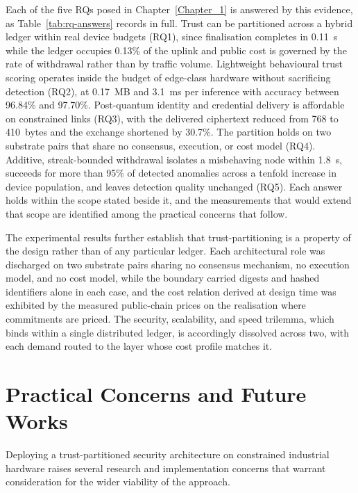 Each of the five RQs posed in Chapter~\ref{Chapter_1} is answered by this evidence, as Table~\ref{tab:rq-answers} records in full. Trust can be partitioned across a hybrid ledger within real device budgets (RQ1), since finalisation completes in 0.11~s while the ledger occupies 0.13\% of the uplink and public cost is governed by the rate of withdrawal rather than by traffic volume. Lightweight behavioural trust scoring operates inside the budget of edge-class hardware without sacrificing detection (RQ2), at 0.17~MB and 3.1~ms per inference with accuracy between 96.84\% and 97.70\%. Post-quantum identity and credential delivery is affordable on constrained links (RQ3), with the delivered ciphertext reduced from 768 to 410~bytes and the exchange shortened by 30.7\%. The partition holds on two substrate pairs that share no consensus, execution, or cost model (RQ4). Additive, streak-bounded withdrawal isolates a misbehaving node within 1.8~s, succeeds for more than 95\% of detected anomalies across a tenfold increase in device population, and leaves detection quality unchanged (RQ5). Each answer holds within the scope stated beside it, and the measurements that would extend that scope are identified among the practical concerns that follow.

The experimental results further establish that trust-partitioning is a property of the design rather than of any particular ledger. Each architectural role was discharged on two substrate pairs sharing no consensus mechanism, no execution model, and no cost model, while the boundary carried digests and hashed identifiers alone in each case, and the cost relation derived at design time was exhibited by the measured public-chain prices on the realisation where commitments are priced. The security, scalability, and speed trilemma, which binds within a single distributed ledger, is accordingly dissolved across two, with each demand routed to the layer whose cost profile matches it.

\section{Practical Concerns and Future Works}
\label{sec:future-work}

Deploying a trust-partitioned security architecture on constrained industrial hardware raises several research and implementation concerns that warrant consideration for the wider viability of the approach.


